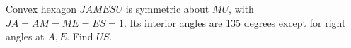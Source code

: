 Convex hexagon $JAMESU$ is symmetric about $MU$, with $JA=AM=ME=ES=1$. Its interior angles are 135 degrees except for right angles at $A,E$. Find $US$.
